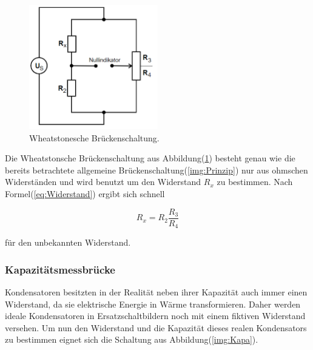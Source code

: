             \begin{figure}[ht]
                \centering
                \includegraphics[width=0.5\textwidth]{latex/images/Wheat.PNG}
                \caption{Wheatstonesche Brückenschaltung\protect \cite{V302}.}
                \label{img:Wheat}
            \end{figure}

            \noindent Die Wheatstonsche Brückenschaltung aus Abbildung(\ref{img:Wheat}) besteht genau wie die bereits betrachtete allgemeine 
            Brückenschaltung(\ref{img:Prinzip}) nur aus ohmschen Widerständen und wird benutzt um den Widerstand $R_x$ zu bestimmen. 
            Nach Formel(\ref{eq:Widerstand}) ergibt sich schnell 

            \begin{equation}
                R_x = R_2 \frac{R_3}{R_4}
            \end{equation}

            \noindent für den unbekannten Widerstand.

        \subsubsection{Kapazitätsmessbrücke}

            \noindent Kondensatoren besitzten in der Realität neben ihrer Kapazität auch immer einen Widerstand, da sie elektrische Energie 
            in Wärme transformieren. Daher werden ideale Kondensatoren in Ersatzschaltbildern noch mit einem fiktiven Widerstand versehen. 
            Um nun den Widerstand und die Kapazität dieses realen Kondensators zu bestimmen eignet sich die Schaltung aus 
            Abbildung(\ref{img:Kapa}).

